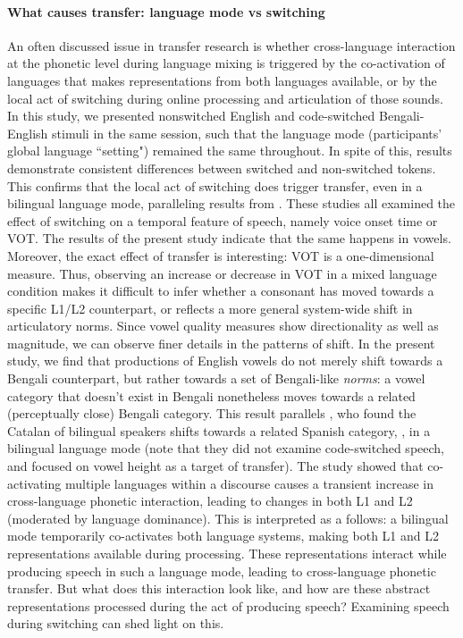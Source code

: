 \documentclass[12 pt]{article}
\newcommand{\nt}[1]{\textipa{[#1]}} %
\begin{document}
\paragraph{\textbf{What causes transfer: language mode vs switching}}
An often discussed issue in transfer research is whether cross-language interaction at the phonetic level during language mixing is triggered by the co-activation of languages that makes representations from both languages available, or by the local act of switching during online processing and articulation of those sounds. In this study, we presented nonswitched English and code-switched Bengali-English stimuli in the same session, such that the language mode (participants' global language ``setting") remained the same throughout. In spite of this, results demonstrate consistent differences between switched and non-switched tokens. This confirms that the local act of switching does trigger transfer, even in a bilingual language mode, paralleling results from \cite{olson2016role, tsui2019impact, piccinini2015voice}. These studies all examined the effect of switching on a temporal feature of speech, namely voice onset time or VOT. The results of the present study indicate that the same happens in vowels. Moreover, the exact effect of transfer is interesting: VOT is a one-dimensional measure. Thus, observing an increase or decrease in VOT in a mixed language condition makes it difficult to infer whether a consonant has moved towards a specific L1/L2 counterpart, or reflects a more general system-wide shift in articulatory norms. Since vowel quality measures show directionality as well as magnitude, we can observe finer details in the patterns of shift. In the present study, we find that productions of English vowels do not merely shift towards a Bengali counterpart, but rather towards a set of Bengali-like \textit{norms}: a vowel category that doesn't exist in Bengali nonetheless moves towards a related (perceptually close) Bengali category. This result parallels \cite{simonet2014phonetic}, who found the Catalan \nt{O} of bilingual speakers shifts towards a related Spanish category, \nt{o}, in a bilingual language mode (note that they did not examine code-switched speech, and focused on vowel height as a target of transfer). The study showed that co-activating multiple languages within a discourse causes a transient increase in cross-language phonetic interaction, leading to changes in both L1 and L2 (moderated by language dominance). This is interpreted as a follows: a bilingual mode temporarily co-activates both language systems, making both L1 and L2 representations available during processing. These representations interact while producing speech in such a language mode, leading to cross-language phonetic transfer. But what does this interaction look like, and how are these abstract representations processed during the act of producing speech? Examining speech during switching can shed light on this.
\end{document}
